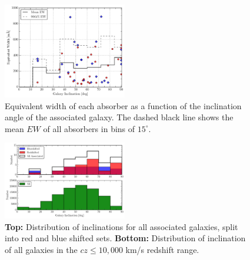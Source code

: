 \documentclass[iop]{emulateapj-rtx4}
\begin{document}
%


\begin{figure}[h!]
        \centering
        \includegraphics[width=0.48\textwidth]{W(fancy_inc)_mean_90_hist.pdf}
        \caption{\small{Equivalent width of each absorber as a function of the inclination angle of the associated galaxy. The dashed black line shows the mean $EW$ of all absorbers in bins of $15^{\circ}$.}}
        \label{ew_vs_inclination}
        \vspace{2pt}
\end{figure}

\begin{figure}[h!]
        \centering
        \includegraphics[width=0.48\textwidth]{hist(fancy_inclination)_red_blue_full_all.pdf}
        \caption{\small{\textbf{Top: }Distribution of inclinations for all associated galaxies, split into red and blue shifted sets. \textbf{Bottom:} Distribution of inclination of all galaxies in the $cz \leq 10,000$ km/s redshift range.}}
        \label{hist_inc}
        \vspace{2pt}
\end{figure}
\end{document}

